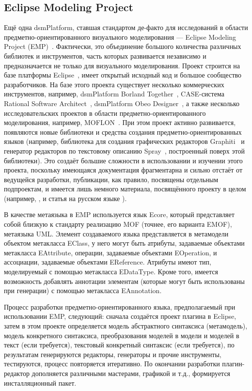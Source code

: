 \subsection{Eclipse Modeling Project}
Ещё одна \ac{dsmPlatform}, ставшая стандартом де-факто для исследований в области предметно-ориентированного визуального моделирования --- 
Eclipse Modeling Project (EMP)~\cite{emp}. Фактически, это объединение большого количества 
различных библиотек и инструментов, часть которых развивается независимо и предназначается не только 
для визуального моделирования. Проект строится на базе платформы Eclipse~\cite{eclipse}, 
имеет открытый исходный код и большое сообщество разработчиков. На базе этого 
проекта существует несколько коммерческих инструментов, например, \ac{dsmPlatform} Borland Together~\cite{together}, 
CASE-система Rational Software Architect~\cite{rsa}, \ac{dsmPlatform} Obeo Designer~\cite{obeoDesigner}, 
а также несколько исследовательских проектов в области предметно-ориентированного моделирования, например, 
MOFLON~\cite{amelunxen2008metamodel}. При этом проект активно развивается, появляются 
новые библиотеки и средства создания предметно-ориентированных языков (например, библиотека для создания графических редакторов 
Graphiti~\cite{graphiti} и генератор редакторов по текстовому описанию Spray~\cite{spray}, 
построенный поверх этой библиотеки). Это создаёт большие сложности в использовании и изучении этого проекта, поскольку имеющаяся документация 
фрагментарна и сильно отстаёт от ведущейся разработки, публикации, как правило, посвящены 
отдельным подпроектам, и имеется лишь немного материала, посвящённого проекту в целом 
(например, \cite{gronback2009eclipse}, и статья на русском языке \cite{sorokin2010obzor}).

В качестве метаязыка в EMP используется язык Ecore, который представляет собой близкую 
к стандарту реализацию MOF (точнее, его варианта EMOF), метаязыка UML. Элемент создаваемого 
языка представляется в метамодели объектом метакласса EClass, у него могут быть атрибуты, 
задаваемые объектами метакласса EAttribute, операции, задаваемые объектами EOperation, и 
ассоциации, задаваемые объектами EReference. Атрибуты имеют тип, моделируемый с помощью 
метакласса EDataType. Кроме того, имеется возможность добавлять аннотации элементам 
(которые могут быть использованы при генерации) с помощью метакласса EAnnotation.

Процесс разработки предметно-ориентированного языка, предполагаемый при использовании EMP, 
следующий: сначала создаётся проект плагина в Eclipse, затем в этом проекте определяется 
модель абстрактного синтаксиса (метамодель), модель конкретного синтаксиса, преобразования 
моделей в модели и моделей в текст (если требуется), текстовый конкретный синтаксис 
(если требуется), по результатам генерируются редакторы, генераторы и прочие инструменты, 
тестируются, процесс повторяется итеративно. По окончании разработки плагин-редактор 
дополняется различными мастерами, графикой и т.д., формируется инсталляционный пакет.

